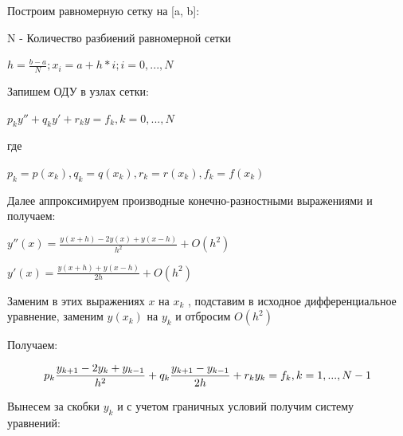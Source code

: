 Построим равномерную сетку на [a, b]:

N - Количество разбиений равномерной сетки

\begin{math}
	h = \frac{b-a}{N}; x_{i}=a+h*i; i=0,...,N
\end{math}

Запишем ОДУ в узлах сетки: 

\begin{math}
	p_{k}y''+q_{k}y'+r_{k}y=f_{k}, k=0,...,N
\end{math}

где 

\begin{math}
	p_{k}=p(x_{k}), q_{k}=q(x_{k}), r_{k}=r(x_{k}), f_{k}=f(x_{k})
\end{math}

Далее аппроксимируем производные конечно-разностными выражениями и получаем: 

 
\begin{math}
	y''(x)=\frac{y(x+h)-2y(x)+y(x-h)}{h^{2}}+O(h^{2})
\end{math}

\begin{math}
	y'(x)=\frac{y(x+h)+y(x-h)}{2h}+O(h^{2})
\end{math}

Заменим в этих выражениях \begin{math}
	x
\end{math} на 
\begin{math}
	x_{k}
\end{math} , подставим в исходное дифференциальное уравнение, заменим \begin{math}
y(x_{k})
\end{math} на \begin{math}
y_{k}
\end{math} и отбросим 
\begin{math}
	O(h^{2})
\end{math}

Получаем: 

\begin{equation}
	p_{k}\frac{y_{k+1}-2y_{k}+y_{k-1}}{h^{2}}+q_{k}\frac{y_{k+1}-y_{k-1}}{2h}+r_{k}y_{k}=f_{k}, k=1,...,N-1 \\
\end{equation}

Вынесем за скобки \begin{math}
	y_{k}
\end{math} и с учетом граничных условий получим систему уравнений:


